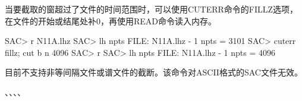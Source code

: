 当要截取的窗超过了文件的时间范围时，可以使用CUTERR命令的FILLZ选项，
在文件的开始或结尾处补0，再使用READ命令读入内存。
\begin{SACCode}
SAC> r N11A.lhz
SAC> lh npts
FILE: N11A.lhz - 1
npts = 3101
SAC> cuterr fillz; cut b n 4096
SAC> r
SAC> lh npts
FILE: N11A.lhz - 1
npts = 4096
\end{SACCode}

目前不支持非等间隔文件或谱文件的截断。该命令对ASCII格式的SAC文件无效。

、、、、
